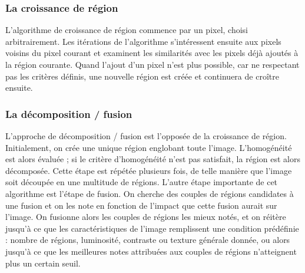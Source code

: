	\subsubsection{La croissance de région}
		L'algorithme de croissance de région commence par un pixel, choisi arbitrairement. Les itérations de l'algorithme s'intéressent ensuite aux pixels voisins du pixel courant et examinent les similarités avec les pixels déjà ajoutés à la région courante. Quand l'ajout d'un pixel n'est plus possible, car ne respectant pas les critères définis, une nouvelle région est créée et continuera de croître ensuite.\cite{spatialSegmentation}
	
	\subsubsection{La décomposition / fusion}
		L'approche de décomposition / fusion est l'opposée de la croissance de région. Initialement, on crée une unique région englobant toute l'image. L'homogénéité est alors évaluée ; si le critère d'homogénéité n'est pas satisfait, la région est alors décomposée. Cette étape est répétée plusieurs fois, de telle manière que l'image soit découpée en une multitude de régions. L'autre étape importante de cet algorithme est l'étape de fusion. On cherche des couples de régions candidates à une fusion et on les note en fonction de l'impact que cette fusion aurait sur l'image. On fusionne alors les couples de régions les mieux notés, et on réitère jusqu’à ce que les caractéristiques de l'image remplissent une condition prédéfinie : nombre de régions, luminosité, contraste ou texture générale donnée, ou alors jusqu’à ce que les meilleures notes attribuées aux couples de régions n'atteignent plus un certain seuil.